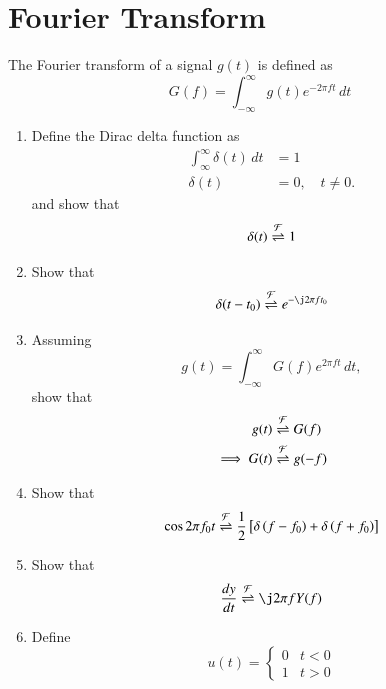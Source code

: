 \documentclass[journal,12pt,twocolumn]{IEEEtran}
\begin{document}
\section{Fourier Transform}
The Fourier transform of a signal $g(t)$ is defined as
\begin{equation}
\label{eq:fourier}
G(f) = \int_{-\infty}^{\infty}g(t)e^{-2\pi f t}\,dt
\end{equation}
\begin{enumerate}[1.]
\item Define the Dirac delta function as
\begin{equation}
\begin{split}
\int_{\infty}^{\infty} \delta(t)\,dt &= 1
\\
\delta(t) &= 0, \quad t \neq 0.
\end{split}
\end{equation}
and show that
\begin{equation}
\delta (t) \overset{\mathcal{F}}{ \rightleftharpoons} 1
\end{equation}
\item Show that 
\begin{equation}
\delta (t-t_0) \fourier e^{-\j2\pi f t_0}
\end{equation}
\item Assuming
\begin{equation}
\label{eq:fourier}
g(t) = \int_{-\infty}^{\infty}G(f)e^{2\pi f t}\,dt,
\end{equation}
show that 
\begin{equation}
\label{eq:duality}
\begin{split}
g(t) & \overset{\mathcal{F}}{ \rightleftharpoons} G(f)
\\
\implies G(t) & \overset{\mathcal{F}}{ \rightleftharpoons} g(-f)
\end{split}
\end{equation}
\item Show that
\begin{equation}
\cos2\pi f_0 t \overset{\mathcal{F}}{ \rightleftharpoons} \frac{1}{2}{}\left[\delta\left(f-f_0\right)+\delta \left(f+f_0\right)\right]
\end{equation}
\item Show that
\begin{equation}
\frac{dy}{dt} \fourier \j 2 \pi f Y(f)
\end{equation}
\item Define
\begin{equation}
u(t) =
\begin{cases}
0 & t < 0
\\
1 & t > 0
\end{cases}
\end{equation}

\end{enumerate}
\end{document}
